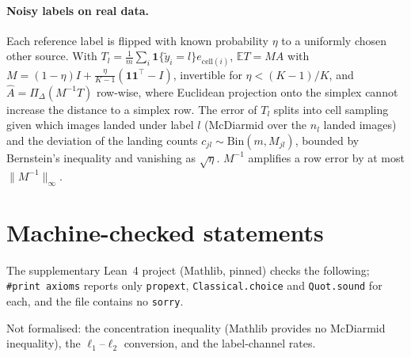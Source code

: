 \documentclass[twoside]{article}
\begin{document}
\paragraph{Noisy labels on real data.} Each reference label is flipped with known probability $\eta$
to a uniformly chosen other source. With $T_l=\frac1m\sum_i\mathbf 1\{\tilde y_i=l\}e_{\mathrm{cell}(i)}$,
$\mathbb ET=MA$ with $M=(1-\eta)I+\frac{\eta}{K-1}(\mathbf 1\mathbf 1^{\top}-I)$, invertible for
$\eta<(K-1)/K$, and $\hat A=\Pi_\Delta(M^{-1}T)$ row-wise, where Euclidean projection onto the
simplex cannot increase the distance to a simplex row. The error of $T_l$ splits into cell sampling
given which images landed under label $l$ (McDiarmid over the $n_l$ landed images) and the deviation
of the landing counts $c_{jl}\sim\mathrm{Bin}(m,M_{jl})$, bounded by Bernstein's inequality and
vanishing as $\sqrt\eta$. $M^{-1}$ amplifies a row error by at most $\lVert M^{-1}\rVert_\infty$.

\section{Machine-checked statements}
\label{app:lean}

The supplementary Lean~4 project (Mathlib, pinned) checks the following; \texttt{\#print axioms}
reports only \texttt{propext}, \texttt{Classical.choice} and \texttt{Quot.sound} for each, and the file
contains no \texttt{sorry}.

\begin{center}\small
{}
\end{center}
Not formalised: the concentration inequality (Mathlib provides no McDiarmid inequality), the
$\ell_1$--$\ell_2$ conversion, and the label-channel rates.
\end{document}

